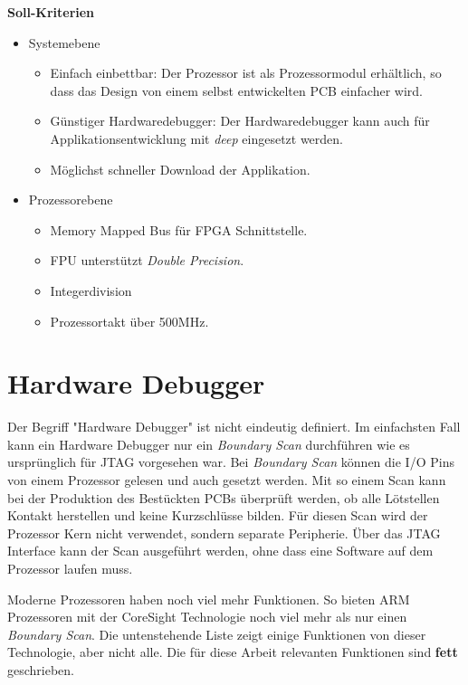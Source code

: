 \textbf{Soll-Kriterien}
\begin{itemize}
\item Systemebene
	\begin{itemize}
	\item Einfach einbettbar: Der Prozessor ist als Prozessormodul erhältlich, so dass das Design von einem selbst entwickelten PCB einfacher wird.
	\item Günstiger Hardwaredebugger: Der Hardwaredebugger kann auch für Applikationsentwicklung mit \textit{deep} eingesetzt werden.
	\item Möglichst schneller Download der Applikation.
	\end{itemize}
\item Prozessorebene
	\begin{itemize}
	\item Memory Mapped Bus für FPGA Schnittstelle.
	\item FPU unterstützt \textit{Double Precision}.
	\item Integerdivision
	\item Prozessortakt über 500MHz.
	\end{itemize}
\end{itemize}


\section{Hardware Debugger}
Der Begriff "Hardware Debugger" ist nicht eindeutig definiert.
Im einfachsten Fall kann ein Hardware Debugger nur ein \textit{Boundary Scan} durchführen wie es ursprünglich für JTAG vorgesehen war.
Bei \textit{Boundary Scan} können die I/O Pins von einem Prozessor gelesen und auch gesetzt werden.
Mit so einem Scan kann bei der Produktion des Bestückten PCBs überprüft werden, ob alle Lötstellen Kontakt herstellen und keine Kurzschlüsse bilden.
Für diesen Scan wird der Prozessor Kern nicht verwendet, sondern separate Peripherie.
Über das JTAG Interface kann der Scan ausgeführt werden, ohne dass eine Software auf dem Prozessor laufen muss.

Moderne Prozessoren haben noch viel mehr Funktionen.
So bieten ARM Prozessoren mit der CoreSight Technologie noch viel mehr als nur einen \textit{Boundary Scan}.
Die untenstehende Liste zeigt einige Funktionen von dieser Technologie, aber nicht alle.
Die für diese Arbeit relevanten Funktionen sind \textbf{fett} geschrieben.

